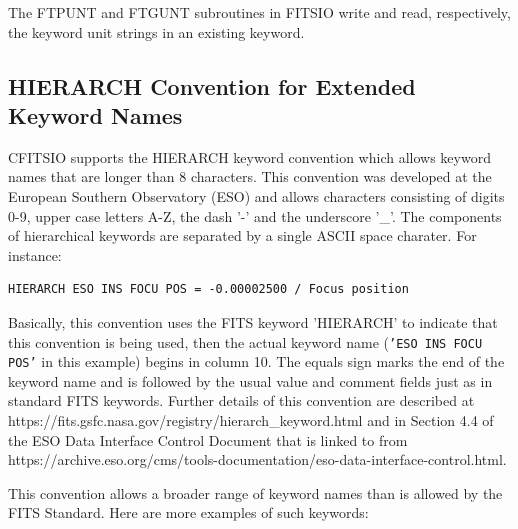 \documentclass[11pt]{book}
\begin{document}
The FTPUNT and FTGUNT subroutines in FITSIO write and read,
respectively, the keyword unit strings in an existing keyword.


\subsection{HIERARCH Convention for Extended Keyword Names}

CFITSIO supports the HIERARCH keyword convention which allows keyword
names that are longer than 8 characters.  This convention
was developed at the European Southern Observatory (ESO) and allows characters
consisting of digits 0-9, upper case letters A-Z, the dash '-' and the underscore '\_'.
The components of hierarchical keywords are separated by a single ASCII space charater.
For instance:

\begin{verbatim}
HIERARCH ESO INS FOCU POS = -0.00002500 / Focus position
\end{verbatim}
Basically, this convention uses the FITS keyword 'HIERARCH' to indicate
that this convention is being used, then the actual keyword name
({\tt'ESO INS FOCU POS'} in this example) begins in column 10.  The
equals sign marks the end of the keyword name and is followed by the
usual value and comment fields just as in standard FITS keywords.
Further details of this convention are described at
https://fits.gsfc.nasa.gov/registry/hierarch\_keyword.html
and in Section 4.4 of the ESO Data Interface Control Document that
is linked to from
https://archive.eso.org/cms/tools-documentation/eso-data-interface-control.html.

This convention allows a broader range of keyword names
than is allowed by the FITS Standard.  Here are more examples
of such keywords:
\end{document}
